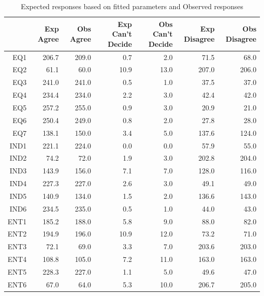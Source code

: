\documentclass{article}\usepackage[]{graphicx}\usepackage[]{color}
\begin{document}
\begin{table}[ht]
\centering
\begin{tabular}{rrrrrrr}
  \hline
 & Exp Agree & Obs Agree & Exp Can't Decide & Obs Can't Decide & Exp Disagree & Obs Disagree \\ 
  \hline
EQ1 & 206.7 & 209.0 & 0.7 & 2.0 & 71.5 & 68.0 \\ 
  EQ2 & 61.1 & 60.0 & 10.9 & 13.0 & 207.0 & 206.0 \\ 
  EQ3 & 241.0 & 241.0 & 0.5 & 1.0 & 37.5 & 37.0 \\ 
  EQ4 & 234.4 & 234.0 & 2.2 & 3.0 & 42.4 & 42.0 \\ 
  EQ5 & 257.2 & 255.0 & 0.9 & 3.0 & 20.9 & 21.0 \\ 
  EQ6 & 250.4 & 249.0 & 0.8 & 2.0 & 27.8 & 28.0 \\ 
  EQ7 & 138.1 & 150.0 & 3.4 & 5.0 & 137.6 & 124.0 \\ 
  IND1 & 221.1 & 224.0 & 0.0 & 0.0 & 57.9 & 55.0 \\ 
  IND2 & 74.2 & 72.0 & 1.9 & 3.0 & 202.8 & 204.0 \\ 
  IND3 & 143.9 & 156.0 & 7.1 & 7.0 & 128.0 & 116.0 \\ 
  IND4 & 227.3 & 227.0 & 2.6 & 3.0 & 49.1 & 49.0 \\ 
  IND5 & 140.9 & 134.0 & 1.5 & 2.0 & 136.6 & 143.0 \\ 
  IND6 & 234.5 & 235.0 & 0.5 & 1.0 & 44.0 & 43.0 \\ 
  ENT1 & 185.2 & 188.0 & 5.8 & 9.0 & 88.0 & 82.0 \\ 
  ENT2 & 194.9 & 196.0 & 10.9 & 12.0 & 73.2 & 71.0 \\ 
  ENT3 & 72.1 & 69.0 & 3.3 & 7.0 & 203.6 & 203.0 \\ 
  ENT4 & 108.8 & 105.0 & 7.2 & 11.0 & 163.0 & 163.0 \\ 
  ENT5 & 228.3 & 227.0 & 1.1 & 5.0 & 49.6 & 47.0 \\ 
  ENT6 & 67.0 & 64.0 & 5.3 & 10.0 & 206.7 & 205.0 \\ 
   \hline
\end{tabular}
\caption{Expected responses based on fitted parameters and Observed responses} 
\end{table}
\end{document}
